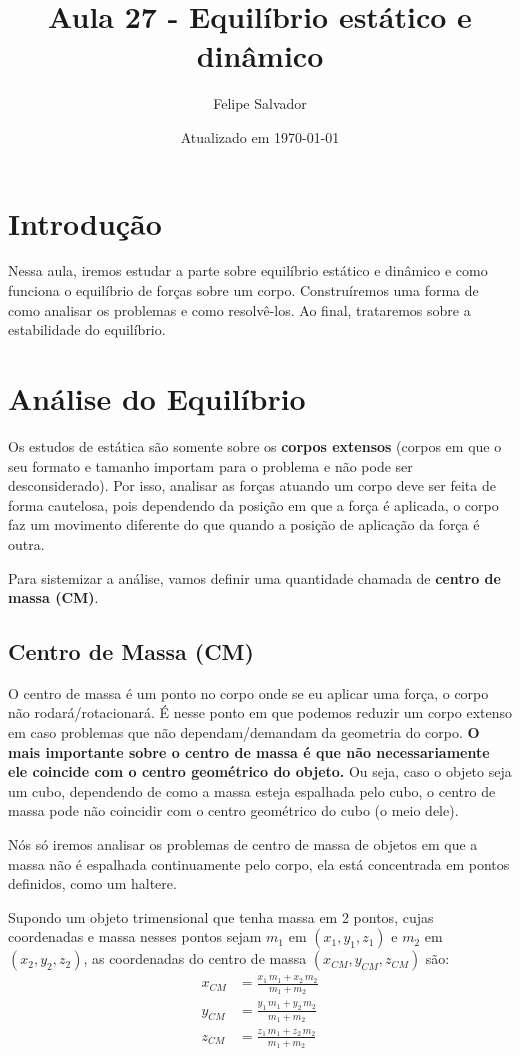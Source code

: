 \documentclass[12pt]{extarticle}
\title{Aula 27 - Equilíbrio estático e dinâmico}
\author{Felipe Salvador}
\date{Atualizado em \today}
\newcommand{\<}{\langle}
\renewcommand{\>}{\rangle}
\theoremstyle{definition}
\begin{document}
\maketitle

\section{Introdução}
Nessa aula, iremos estudar a parte sobre equilíbrio estático e dinâmico e como funciona o equilíbrio de forças sobre um corpo. Construíremos uma forma de como analisar os problemas e como resolvê-los. Ao final, trataremos sobre a estabilidade do equilíbrio.

\section{Análise do Equilíbrio}
Os estudos de estática são somente sobre os \textbf{corpos extensos} (corpos em que o seu formato e tamanho importam para o problema e não pode ser desconsiderado). Por isso, analisar as forças atuando um corpo deve ser feita de forma cautelosa, pois dependendo da posição em que a força é aplicada, o corpo faz um movimento diferente do que quando a posição de aplicação da força é outra.

Para sistemizar a análise, vamos definir uma quantidade chamada de \textbf{centro de massa (CM)}.

\subsection{Centro de Massa (CM)}

O centro de massa é um ponto no corpo onde se eu aplicar uma força, o corpo não rodará/rotacionará. É nesse ponto em que podemos reduzir um corpo extenso em caso problemas que não dependam/demandam da geometria do corpo. \textbf{O mais importante sobre o centro de massa é que não necessariamente ele coincide com o centro geométrico do objeto.} Ou seja, caso o objeto seja um cubo, dependendo de como a massa esteja espalhada pelo cubo, o centro de massa pode não coincidir com o centro geométrico do cubo (o meio dele).

Nós só iremos analisar os problemas de centro de massa de objetos em que a massa não é espalhada continuamente pelo corpo, ela está concentrada em pontos definidos, como um haltere.

Supondo um objeto trimensional que tenha massa em 2 pontos, cujas coordenadas e massa nesses pontos sejam $m_1$ em $(x_1,y_1,z_1)$ e $m_2$ em $(x_2,y_2,z_2)$, as coordenadas do centro de massa $(x_{CM},y_{CM},z_{CM})$ são:
\begin{equation}
    \begin{split}
        x_{CM} &= \frac{x_1\,m_1 + x_2\,m_2}{m_1+m_2}\\
        y_{CM} &= \frac{y_1\,m_1 + y_2\,m_2}{m_1+m_2}\\
        z_{CM} &= \frac{z_1\,m_1 + z_2\,m_2}{m_1+m_2}
    \end{split}
\end{equation}
\end{document}
